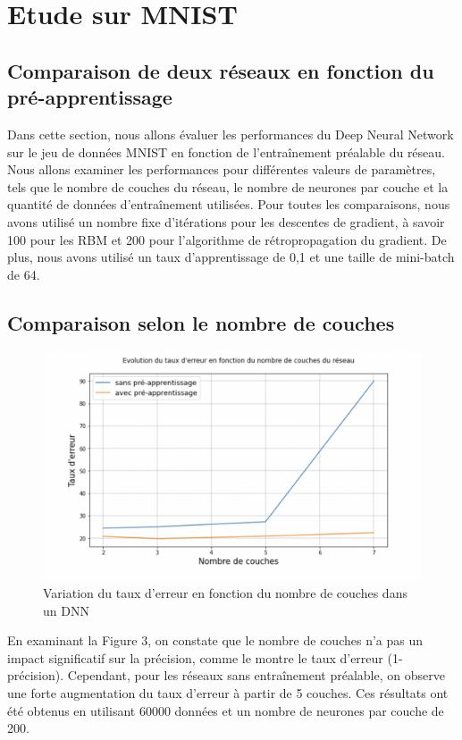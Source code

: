 \section{Etude sur MNIST}
\subsection{Comparaison de deux réseaux en fonction du pré-apprentissage} 

Dans cette section, nous allons évaluer les performances du Deep Neural Network sur le jeu de données MNIST en fonction de l'entraînement préalable du réseau. Nous allons examiner les performances pour différentes valeurs de paramètres, tels que le nombre de couches du réseau, le nombre de neurones par couche et la quantité de données d'entraînement utilisées. Pour toutes les comparaisons, nous avons utilisé un nombre fixe d'itérations pour les descentes de gradient, à savoir 100 pour les RBM et 200 pour l'algorithme de rétropropagation du gradient. De plus, nous avons utilisé un taux d'apprentissage de 0,1 et une taille de mini-batch de 64.


\subsection{Comparaison selon le nombre de couches}

\begin{figure}[H]\includegraphics[width=140mm]{images/DNN1.png}
\caption{Variation du taux d'erreur en fonction du nombre de couches dans un DNN}
\end{figure}
En examinant la Figure 3, on constate que le nombre de couches n'a pas un impact significatif sur la précision, comme le montre le taux d'erreur (1-précision). Cependant, pour les réseaux sans entraînement préalable, on observe une forte augmentation du taux d'erreur à partir de 5 couches. Ces résultats ont été obtenus en utilisant 60000 données et un nombre de neurones par couche de 200.


